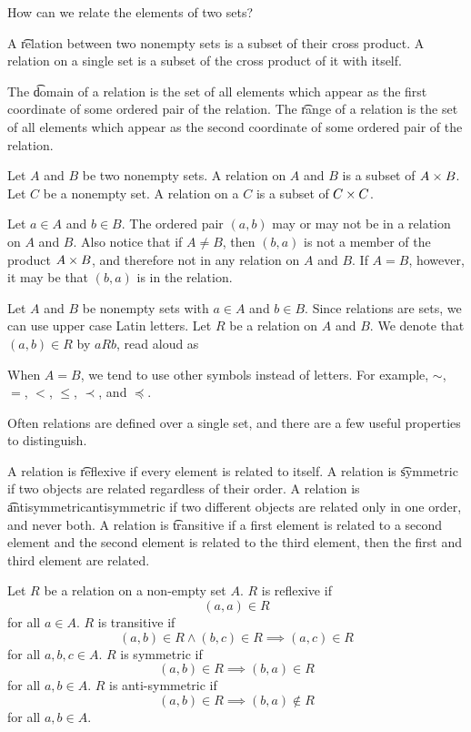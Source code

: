 

How can we relate the elements of two sets?


A \t{relation} between two nonempty sets is a subset of their cross product.
A relation on a single set is a subset of the cross product of it with itself.

The \t{domain} of a relation is the set of all elements which appear as the first coordinate of some ordered pair of the relation.
The \t{range} of a relation is the set of all elements which appear as the second coordinate of some ordered pair of the relation.


Let $A$ and $B$ be two nonempty sets.
A relation on $A$ and $B$ is a subset of $A \times B$.
Let $C$ be a nonempty set.
A relation on a $C$ is a subset of $C \times C$.

Let $a \in A$ and $b \in B$.
The ordered pair $(a, b)$ may or may not be in a relation on $A$ and $B$.
Also notice that if $A \neq B$, then $(b, a)$ is not a member of the product $A \times B$, and therefore not in any relation on $A$ and $B$.
If $A = B$, however, it may be that $(b, a)$ is in the relation.


Let $A$ and $B$ be nonempty sets
with $a \in A$ and $b \in B$.
Since relations are sets,
we can use upper case Latin letters.
Let $R$ be a relation on $A$ and $B$.
We denote that $(a, b) \in R$ by
$a R b$, read aloud as

When $A = B$, we tend to use other symbols instead of letters.
For example,
$\sim$, $=$, $<$,
$\leq$, $\prec$, and $\preceq$.


Often relations are defined over a single set, and there are a few useful properties to distinguish.

A relation is \t{reflexive} if every element is related to itself.
A relation is \t{symmetric} if two objects are related regardless of their order.
A relation is \t{antisymmetric}{antisymmetric} if two different objects are related only in one order, and never both.
A relation is \t{transitive} if a first element is related to a second element and the second element is related to the third element, then the first and third element are related.


Let $R$ be a relation on
a non-empty set $A$.
$R$ is reflexive if
$$(a, a) \in R$$
for all $a \in A$.
$R$ is transitive if
$$(a, b) \in R \land (b, c) \in R \implies (a, c) \in R$$
for all $a, b, c \in A$.
$R$ is symmetric if
$$(a, b) \in R \implies (b, a) \in R$$
for all $a, b \in A$.
$R$ is anti-symmetric if
$$(a, b) \in R \implies (b, a) \not\in R$$
for all $a, b \in A$.

\blankpage
